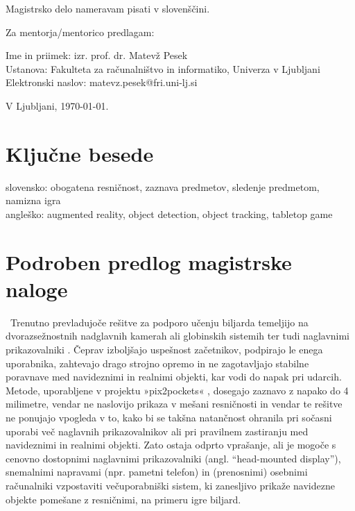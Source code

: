\documentclass[a4paper, 12pt]{article}
\begin{document}
Magistrsko delo nameravam pisati v slovenščini. %

Za mentorja/mentorico predlagam:

\hfill\begin{minipage}{\dimexpr\textwidth-2cm}
Ime in priimek: izr. prof. dr. Matevž Pesek\\
Ustanova: Fakulteta za računalništvo in informatiko, Univerza v Ljubljani\\
Elektronski naslov: matevz.pesek@fri.uni-lj.si
\end{minipage}

\bigskip

\hfill V Ljubljani, \today.\newpage

\section{Ključne besede}

slovensko: obogatena resničnost, zaznava predmetov, sledenje predmetom, namizna igra \\
angleško: augmented reality, object detection, object tracking, tabletop game

\section*{Podroben predlog magistrske naloge}
\ProblemParagraph~Trenutno prevladujoče rešitve za podporo učenju biljarda temeljijo na dvorazsežnostnih nadglavnih kamerah ali globinskih sistemih ter tudi naglavnimi prikazovalniki \cite{Sousa2016,WenKai2024,Yan2024Enhancing, BWisePool2025}. Čeprav izboljšajo uspešnost začetnikov, podpirajo le enega uporabnika, zahtevajo drago strojno opremo in ne zagotavljajo stabilne poravnave med navideznimi in realnimi objekti, kar vodi do napak pri udarcih. Metode, uporabljene v projektu »pix2pockets« \cite{schiøtt2025pix2pocketsshotsuggestions8ball}, dosegajo zaznavo z napako do 4 milimetre, vendar ne naslovijo prikaza v mešani resničnosti in vendar te rešitve ne ponujajo vpogleda v to, kako bi se takšna natančnost ohranila pri sočasni uporabi več naglavnih prikazovalnikov ali pri pravilnem zastiranju med navideznimi in realnimi objekti. Zato ostaja odprto vprašanje, ali je mogoče s cenovno dostopnimi naglavnimi prikazovalniki (angl. ``head-mounted display''), snemalnimi napravami (npr. pametni telefon) in (prenosnimi) osebnimi računalniki vzpostaviti večuporabniški sistem, ki zanesljivo prikaže navidezne objekte pomešane z resničnimi, na primeru igre biljard.
\end{document}
